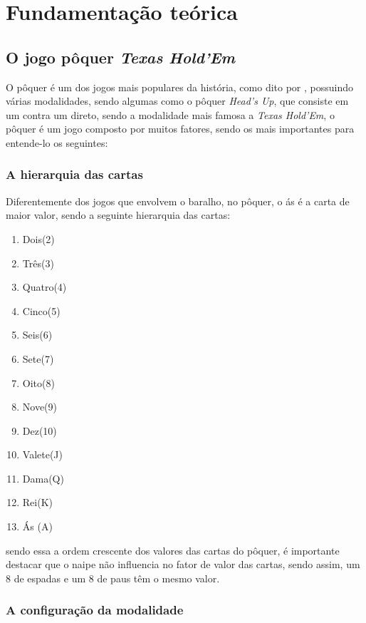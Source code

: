 \chapter{Fundamentação teórica}
\label{cap:fundamentacao-teorica}
\section{O jogo pôquer \textit{Texas Hold'Em}}

O pôquer é um dos jogos mais populares da história, como dito por , possuindo várias modalidades, sendo algumas como o pôquer \textit{Head's Up}, que consiste em um contra um direto, sendo a modalidade mais famosa a \textit{Texas Hold'Em}, o pôquer é um jogo composto por muitos fatores, sendo os mais importantes para entende-lo os seguintes:

\subsection{A hierarquia das cartas}

Diferentemente dos jogos que envolvem o baralho, no pôquer, o ás é a carta de maior valor, sendo a seguinte hierarquia das cartas:

\begin{enumerate}
      \item Dois(2) \twos
      \item Três(3) \tres
      \item Quatro(4) \fours
      \item Cinco(5) \fives
      \item Seis(6) \sixs
      \item Sete(7) \sevs
      \item Oito(8) \eigs
      \item Nove(9) \nines
      \item Dez(10) \tens
      \item Valete(J) \Js
      \item Dama(Q) \Qs
      \item Rei(K) \Ks
      \item Ás (A) \As
\end{enumerate}

sendo essa a ordem crescente dos valores das cartas do pôquer, é importante destacar que o naipe não influencia no fator de valor das cartas, sendo assim, um 8 de espadas e um 8 de paus têm o mesmo valor.

\subsection{A configuração da modalidade}


